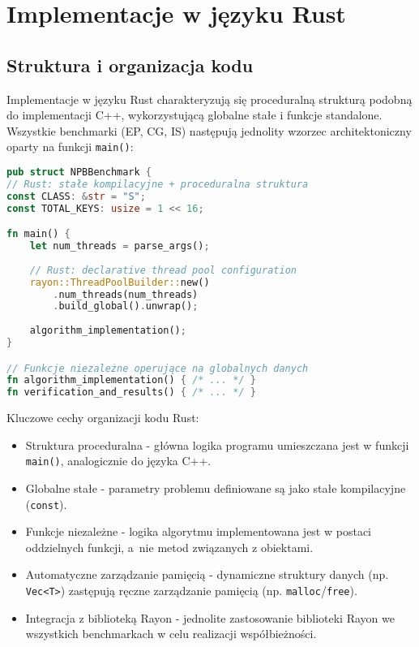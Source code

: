 \section{Implementacje w języku Rust}
\subsection{Struktura i organizacja kodu}
Implementacje w języku Rust charakteryzują się proceduralną strukturą podobną do implementacji C++, wykorzystującą globalne stałe i funkcje standalone. Wszystkie benchmarki (EP, CG, IS) następują jednolity wzorzec architektoniczny oparty na funkcji \texttt{main()}:

\begin{lstlisting}[language=Rust, caption={Struktura kodu benchmarków w języku Rust}, label={lst:rust_structure}]
pub struct NPBBenchmark {
// Rust: stałe kompilacyjne + proceduralna struktura
const CLASS: &str = "S";
const TOTAL_KEYS: usize = 1 << 16;

fn main() {
    let num_threads = parse_args();
    
    // Rust: declarative thread pool configuration
    rayon::ThreadPoolBuilder::new()
        .num_threads(num_threads)
        .build_global().unwrap();
    
    algorithm_implementation();
}

// Funkcje niezależne operujące na globalnych danych
fn algorithm_implementation() { /* ... */ }
fn verification_and_results() { /* ... */ }
\end{lstlisting}
Kluczowe cechy organizacji kodu Rust:
\begin{itemize}
\item Struktura proceduralna - główna logika programu umieszczana jest w funkcji \texttt{main()}, analogicznie do języka C++.
\item Globalne stałe - parametry problemu definiowane są jako stałe kompilacyjne (\texttt{const}).
\item Funkcje niezależne - logika algorytmu implementowana jest w postaci oddzielnych funkcji, a~nie metod związanych z obiektami.
\item Automatyczne zarządzanie pamięcią - dynamiczne struktury danych (np. \texttt{Vec<T>}) zastępują ręczne zarządzanie pamięcią (np. \texttt{malloc}/\texttt{free}).
\item Integracja z biblioteką Rayon - jednolite zastosowanie biblioteki Rayon we wszystkich benchmarkach w celu realizacji współbieżności.
\end{itemize}


